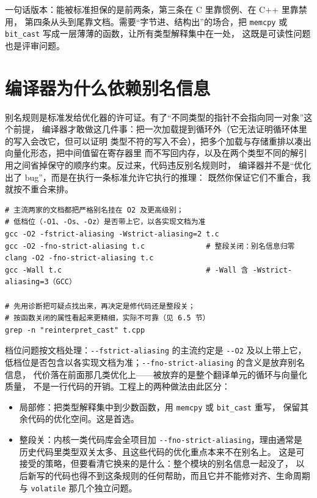 \documentclass[12pt,a4paper,fontset=fandol]{ctexbook}
\newcommand{\Tp}[1]{\texttt{#1}}
\newcommand{\Opt}[1]{\texttt{-\/-#1}}
\newcommand{\Bk}{\discretionary{}{}{}}
\newcommand{\Lang}[1]{\textsf{#1}}
\newcommand{\CL}{\Lang{C}}
\newcommand{\CPP}{\Lang{C++}}
\begin{document}
一句话版本：能被标准担保的是前两条，第三条在 \CL{} 里靠惯例、在 \CPP{} 里靠禁用，
第四条从头到尾靠文档。需要“字节进、结构出”的场合，把 \Tp{memcpy} 或
\Tp{bit{\Bk}\_cast} 写成一层薄薄的函数，让所有类型解释集中在一处，
这既是可读性问题也是评审问题。

\section{编译器为什么依赖别名信息}\label{sec:ub06-why}

别名规则是标准发给优化器的许可证。有了“不同类型的指针不会指向同一对象”这个前提，
编译器才敢做这几件事：把一次加载提到循环外（它无法证明循环体里的写入会改它，但可以证明
类型不符的写入不会），把多个加载与存储重排以凑出向量化形态，把中间值留在寄存器里
而不写回内存，以及在两个类型不同的解引用之间省掉保守的顺序约束。反过来，代码违反别名规则时，
编译器并不是“优化出了 bug”，而是在执行一条标准允许它执行的推理：
既然你保证它们不重合，我就按不重合来排。

\begin{lstlisting}[style=shellstyle, caption={与严格别名相关的开关与诊断面}]
# 主流两家的文档都把严格别名挂在 O2 及更高级别；
# 低档位（-O1、-Os、-Oz）是否带上它，以各实现文档为准
gcc -O2 -fstrict-aliasing -Wstrict-aliasing=2 t.c
gcc -O2 -fno-strict-aliasing t.c              # 整段关闭：别名信息归零
clang -O2 -fno-strict-aliasing t.c
gcc -Wall t.c                                 # -Wall 含 -Wstrict-aliasing=3（GCC）

# 先用诊断把可疑点找出来，再决定是修代码还是整段关；
# 按函数关闭的属性看起来更精细，实际不可靠（见 6.5 节）
grep -n "reinterpret_cast" t.cpp
\end{lstlisting}

档位问题按文档处理：\Opt{fstrict-aliasing} 的主流约定是 \Opt{O2} 及以上带上它，
低档位是否包含以各实现文档为准；\Opt{fno{\Bk}-strict{\Bk}-aliasing} 的含义是放弃别名信息，
代价落在前面那几类优化上——被放弃的是整个翻译单元的循环与向量化质量，
不是一行代码的开销。工程上的两种做法由此区分：

\begin{itemize}
\item 局部修：把类型解释集中到少数函数，用 \Tp{memcpy} 或 \Tp{bit{\Bk}\_cast} 重写，
      保留其余代码的优化空间。这是首选。
\item 整段关：内核一类代码库会全项目加 \Opt{fno{\Bk}-strict{\Bk}-aliasing}，理由通常是
      历史代码里类型双关太多、且这些代码的优化重点本来不在别名上。
      这是可接受的策略，但要看清它换来的是什么：整个模块的别名信息一起没了，
      以后新写的代码也得不到这条规则的任何帮助，而且它并不能修对齐、生命周期
      与 \Tp{volatile} 那几个独立问题。
\end{itemize}
\end{document}
